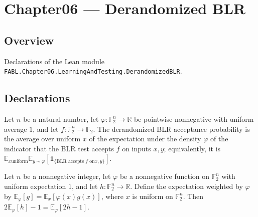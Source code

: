 \chapter{Chapter06 — Derandomized BLR}
\section{Overview}

Declarations of the Lean module \texttt{FABL.Chapter06.LearningAndTesting.DerandomizedBLR}.

\section{Declarations}

\begin{definition}
\label{FABL.derandomizedBLRAcceptanceProbability}
\leanok
{}
Let $n$ be a natural number, let $\varphi\colon\mathbb{F}_2^n\to\mathbb{R}$ be pointwise
nonnegative with uniform average $1$, and let $f\colon\mathbb{F}_2^n\to\mathbb{F}_2$.
The derandomized BLR acceptance probability is the average over uniform $x$ of the
expectation under the density $\varphi$ of the indicator that the BLR test accepts $f$
on inputs $x,y$; equivalently, it is $\mathbb{E}_{x\text{
uniform}}\mathbb{E}_{y\sim\varphi}[\mathbf{1}_{\{\text{BLR accepts }f\text{ on
}x,y\}}]$.
\end{definition}

\begin{theorem}
\label{FABL.two_mul_probabilityDensityExpectation_sub_one}
\leanok
{}
Let $n$ be a nonnegative integer, let $\varphi$ be a nonnegative function on $\mathbb
F_2^n$ with uniform expectation $1$, and let $h:\mathbb F_2^n\to\mathbb R$. Define the
expectation weighted by $\varphi$ by $\mathbb E_\varphi[g]=\mathbb E_x[\varphi(x)g(x)]$,
where $x$ is uniform on $\mathbb F_2^n$. Then $2\mathbb E_\varphi[h]-1=\mathbb
E_\varphi[2h-1]$.
\end{theorem}

